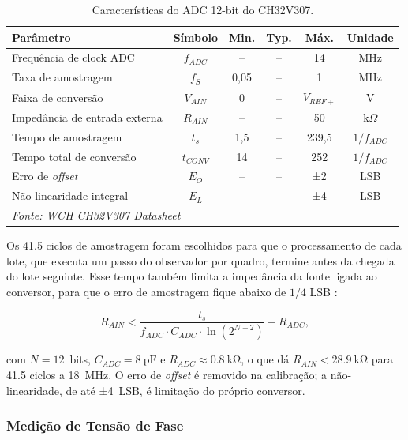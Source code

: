 \begin{table}[h]
\centering
\caption{Características do ADC 12-bit do CH32V307.}
\label{tab:adc_specs}
\begin{tabular}{lccccc}
\hline
\textbf{Parâmetro} & \textbf{Símbolo} & \textbf{Min.} & \textbf{Typ.} & \textbf{Máx.} & \textbf{Unidade} \\
\hline
Frequência de clock ADC & $f_{ADC}$ & -- & -- & 14 & MHz \\
Taxa de amostragem & $f_S$ & 0,05 & -- & 1 & MHz \\
Faixa de conversão & $V_{AIN}$ & 0 & -- & $V_{REF+}$ & V \\
Impedância de entrada externa & $R_{AIN}$ & -- & -- & 50 & k$\Omega$ \\
Tempo de amostragem & $t_s$ & 1,5 & -- & 239,5 & $1/f_{ADC}$ \\
Tempo total de conversão & $t_{CONV}$ & 14 & -- & 252 & $1/f_{ADC}$ \\
Erro de \textit{offset} & $E_O$ & -- & -- & ±2 & LSB \\
Não-linearidade integral & $E_L$ & -- & -- & ±4 & LSB \\
\hline
\multicolumn{6}{l}{\small \textit{Fonte: WCH CH32V307 Datasheet \cite{ch32v307_datasheet}}} \\
\end{tabular}
\end{table}

Os \num{41,5} ciclos de amostragem foram escolhidos para que o processamento
de cada lote, que executa um passo do observador por quadro, termine antes da
chegada do lote seguinte. Esse tempo também limita a impedância da
fonte ligada ao conversor, para que o erro de amostragem fique abaixo de
$1/4$ LSB \cite{ch32v307_datasheet}:

\begin{equation}
R_{AIN} < \frac{t_s}{f_{ADC} \cdot C_{ADC} \cdot \ln(2^{N+2})} - R_{ADC},
\label{eq:rain_max}
\end{equation}

\noindent com $N = 12$~bits, $C_{ADC} = \SI{8}{\pico\farad}$ e
$R_{ADC} \approx \SI{0,8}{\kilo\ohm}$, o que dá
$R_{AIN} < \SI{28,9}{\kilo\ohm}$ para \num{41,5} ciclos a \SI{18}{\mega\hertz}. O erro de
\textit{offset} é removido na calibração; a não-linearidade, de até
±4~LSB, é limitação do próprio conversor.

\subsubsection{Medição de Tensão de Fase}
\label{sec:same_divisor_tensao}

